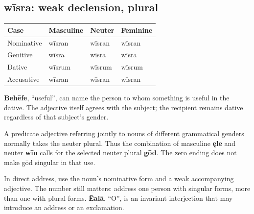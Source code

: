 \subsection*{wīsra: weak declension, plural}

\par\begingroup
\fontsize{10.5}{13.2}\selectfont
\setlength{\LTleft}{0pt}\setlength{\LTright}{\fill}
\noindent
\begin{tabular}{@{}>{\raggedright\arraybackslash}p{28.89mm}>{\raggedright\arraybackslash}p{28.89mm}>{\raggedright\arraybackslash}p{28.89mm}>{\raggedright\arraybackslash}p{28.89mm}@{}}
\toprule
\textbf{Case} & \textbf{Masculine} & \textbf{Neuter} & \textbf{Feminine} \\
\midrule
Nominative & wīsran & wīsran & wīsran \\
Genitive & wīsra & wīsra & wīsra \\
Dative & wīsrum & wīsrum & wīsrum \\
Accusative & wīsran & wīsran & wīsran \\
\bottomrule
\end{tabular}
\par\endgroup

\textbf{Behēfe}, “useful”, can name the person to whom something is useful in the dative. The adjective itself agrees with the subject; the recipient remains dative regardless of that subject’s gender.

A predicate adjective referring jointly to nouns of different grammatical genders normally takes the neuter plural. Thus the combination of masculine \textbf{ęle} and neuter \textbf{wīn} calls for the selected neuter plural \textbf{gōd}. The zero ending does not make gōd singular in that use.

In direct address, use the noun’s nominative form and a weak accompanying adjective. The number still matters: address one person with singular forms, more than one with plural forms. \textbf{Ēalā}, “O”, is an invariant interjection that may introduce an address or an exclamation.

